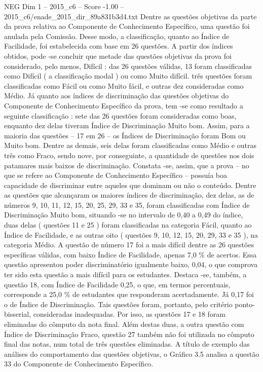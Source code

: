 \begin{textsample}{NEG Dim 1 – 2015\_c6 – Score -1.00 – 2015\_c6/enade\_2015\_dir\_89a831b3d4.txt}
Dentre as questões objetivas da parte da prova relativa ao Componente de Conhecimento Específico, uma questão foi anulada pela Comissão.
Desse modo, a classificação, quanto ao Índice de Facilidade, foi estabelecida com base em 26 questões.
A partir dos índices obtidos, pode -se concluir que metade das questões objetivas da prova foi considerado, pelo menos, Difícil : das 26 questões válidas, 13 foram classificadas como Difícil ( a classificação modal ) ou como Muito difícil. três questões foram classificadas como Fácil ou como Muito fácil, e outras dez consideradas como Médio.
Já quanto aos índices de discriminação das questões objetivas do Componente de Conhecimento Específico da prova, tem -se como resultado a seguinte classificação : sete das 26 questões foram consideradas como boas, enquanto dez delas tiveram Índice de Discriminação Muito bom.
Assim, para a maioria das questões – 17 em 26 – os Índices de Discriminação foram Bom ou Muito bom.
Dentre as demais, seis delas foram classificadas como Médio e outras três como Fraco, sendo nove, por conseguinte, a quantidade de questões nos dois patamares mais baixos de discriminação.
Constata -se, assim, que a prova – no que se refere ao Componente de Conhecimento Específico – possuía boa capacidade de discriminar entre aqueles que dominam ou não o conteúdo.
Dentre as questões que alcançaram os maiores índices de discriminação, dez delas, as de números 9, 10, 11, 12, 15, 20, 25, 29, 33 e 35, foram classificadas com Índice de Discriminação Muito bom, situando -se no intervalo de 0,40 a 0,49 do índice, duas delas ( questões 11 e 25 ) foram classificadas na categoria Fácil, quanto ao Índice de Facilidade, e as outras oito ( questões 9, 10, 12, 15, 20, 29, 33 e 35 ), na categoria Médio.
A questão de número 17 foi a mais difícil dentre as 26 questões específicas válidas, com baixo Índice de Facilidade, apenas 7,0 \% de acertos.
Essa questão apresentou poder discriminatório igualmente baixo, 0,04, o que comprova ter sido esta questão a mais difícil para os estudantes.
Destaca -se, também, a questão 18, com Índice de Facilidade 0,25, o que, em termos percentuais, corresponde a 25,0 \% de estudantes que responderam acertadamente.
Já 0,17 foi o de Índice de Discriminação.
Tais questões foram, portanto, pelo critério ponto-bisserial, consideradas inadequadas.
Por isso, as questões 17 e 18 foram eliminadas do cômputo da nota final.
Além destas duas, a outra questão com Índice de Discriminação Fraco, questão 27 também não foi utilizada no cômputo final das notas, num total de três questões eliminadas.
A título de exemplo das análises do comportamento das questões objetivas, o Gráfico 3.5 analisa a questão 33 do Componente de Conhecimento Específico.

\end{textsample}
